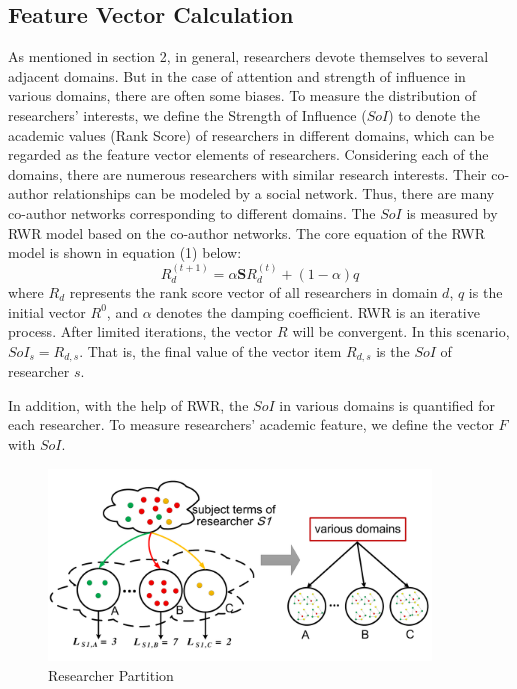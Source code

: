 \documentclass[review]{elsarticle}
\begin{document}
\subsection{Feature Vector Calculation}
As mentioned in section 2, in general, researchers devote themselves to several adjacent domains. But in the case of attention and strength of influence in various domains, there are often some biases. To measure the distribution of researchers' interests, we define the Strength of Influence ($SoI$) to denote the academic values (Rank Score) of researchers in different domains, which can be regarded as the feature vector elements of researchers. Considering each of the domains, there are numerous researchers with similar research interests. Their co-author relationships can be modeled by a social network. Thus, there are many co-author networks corresponding to different domains. The $SoI$ is measured by RWR model based on the co-author networks. The core equation of the RWR model is shown in equation (1) below:
\begin{equation}
R_{d}^{(t+1)}=\alpha \mathbf{S}R_{d}^{(t)}+(1-\alpha)q
\end{equation}
where $R_{d}$ represents the rank score vector of all researchers in domain $d$, $q$ is the initial vector $R^0$, and $\alpha$ denotes the damping coefficient. RWR is an iterative process. After limited iterations, the vector $R$ will be convergent. In this scenario, $SoI_{s}=R_{d,s}$. That is, the final value of the vector item $R_{d,s}$ is the $SoI$ of researcher $s$.


In addition, with the help of RWR, the $SoI$ in various domains is quantified for each researcher. To measure researchers' academic feature, we define the vector $F$ with $SoI$.

\begin{figure}
\centering
\includegraphics [width=4in]{Fig5.pdf}
\caption{Researcher Partition}
\end{figure}
\end{document}
